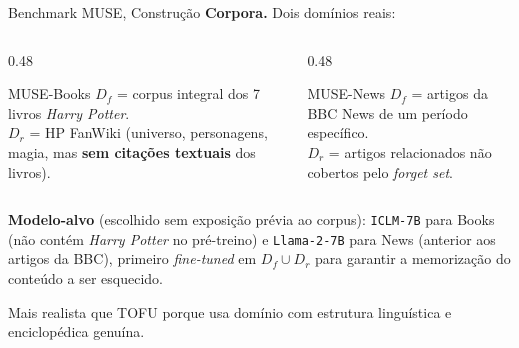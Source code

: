 \documentclass[aspectratio=169,xcolor=dvipsnames]{beamer}
\begin{document}
  \begin{frame}{Benchmark MUSE, Construção}
    \textbf{Corpora.} Dois domínios reais:
    \begin{columns}[T]
      \begin{column}{0.48\textwidth}
        \begin{block}{MUSE-Books}
          $D_f$ = corpus integral dos 7 livros \textit{Harry Potter}.\\[0.2em]
          $D_r$ = HP FanWiki (universo, personagens, magia, mas \textbf{sem citações textuais} dos livros).
        \end{block}
      \end{column}
      \begin{column}{0.48\textwidth}
        \begin{block}{MUSE-News}
          $D_f$ = artigos da BBC News de um período específico.\\[0.2em]
          $D_r$ = artigos relacionados não cobertos pelo \textit{forget set}.
        \end{block}
      \end{column}
    \end{columns}

    \vspace{0.3em}
    \textbf{Modelo-alvo} (escolhido sem exposição prévia ao corpus): \texttt{ICLM-7B} para Books (não contém \textit{Harry Potter} no pré-treino) e \texttt{Llama-2-7B} para News (anterior aos artigos da BBC), primeiro \textit{fine-tuned} em $D_f \cup D_r$ para garantir a memorização do conteúdo a ser esquecido.

    \vspace{0.3em}
    \footnotesize Mais realista que TOFU porque usa domínio com estrutura linguística e enciclopédica genuína.
  \end{frame}
\end{document}
